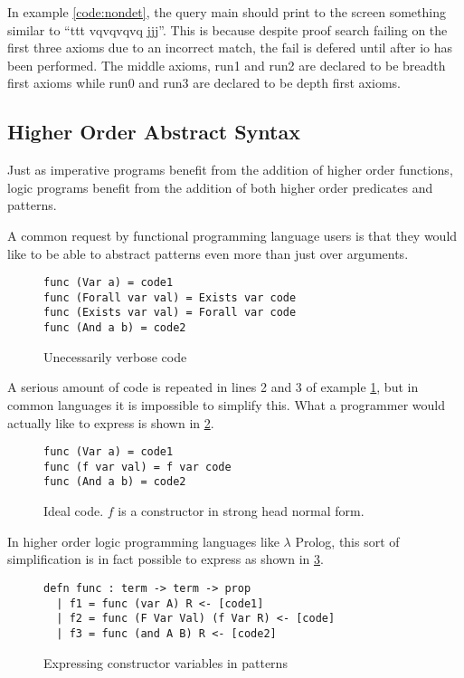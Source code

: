 In example \ref{code:nondet}, the query main should print to the screen something similar to ``ttt vqvqvqvq jjj''.  This is because
despite proof search failing on the first three axioms due to an incorrect match, 
the fail is defered until after io has been performed.  The middle axioms, run1 and run2 are declared to be
breadth first axioms while run0 and run3 are declared to be depth first axioms.  

\FloatBarrier
\subsection{Higher Order Abstract Syntax}

Just as imperative programs benefit from the addition of higher order functions, logic programs benefit from the addition of both
higher order predicates and patterns.  

A common request by functional programming language users is that they would like to be able to abstract patterns even more than just over
arguments.  

\begin{figure}[H]
\begin{lstlisting}
func (Var a) = code1
func (Forall var val) = Exists var code
func (Exists var val) = Forall var code
func (And a b) = code2
\end{lstlisting}
\caption{Unecessarily verbose code}
\label{code:verbose}
\end{figure}

A serious amount of code is repeated in lines 2 and 3 of example \ref{code:verbose}, 
but in common languages it is impossible to simplify this.
What a programmer would actually like to express is shown in \ref{code:Fideal}.

\begin{figure}[H]
\begin{lstlisting}
func (Var a) = code1
func (f var val) = f var code
func (And a b) = code2
\end{lstlisting}
\caption{Ideal code. $f$ is a constructor in strong head normal form.}
\label{code:Fideal}
\end{figure}

In higher order logic programming languages like $\lambda$ Prolog, this sort of simplification 
is in fact possible to express as shown in \ref{code:lprolog}.

\begin{figure}[H]
\begin{lstlisting}
defn func : term -> term -> prop 
  | f1 = func (var A) R <- [code1]
  | f2 = func (F Var Val) (f Var R) <- [code]
  | f3 = func (and A B) R <- [code2]
\end{lstlisting}
\caption{Expressing constructor variables in patterns}
\label{code:lprolog}
\end{figure}

